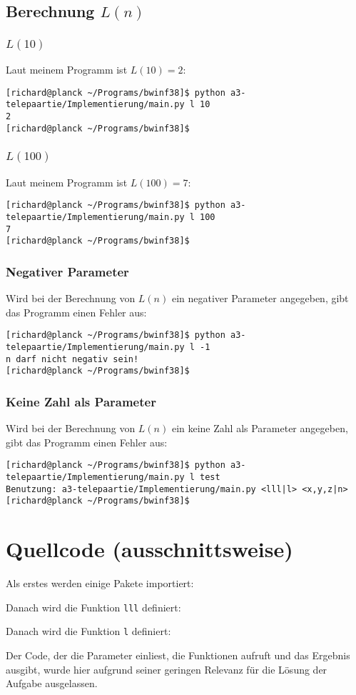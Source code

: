 \documentclass[a4paper,10pt,ngerman]{scrartcl}
\begin{document}
\subsection{Berechnung $L(n)$}
\subsubsection{$L(10)$}
Laut meinem Programm ist $L(10) = 2$:
\begin{lstlisting}
[richard@planck ~/Programs/bwinf38]$ python a3-telepaartie/Implementierung/main.py l 10
2
[richard@planck ~/Programs/bwinf38]$ 
\end{lstlisting}

\subsubsection{$L(100)$}
Laut meinem Programm ist $L(100) = 7$:
\begin{lstlisting}
[richard@planck ~/Programs/bwinf38]$ python a3-telepaartie/Implementierung/main.py l 100
7
[richard@planck ~/Programs/bwinf38]$ 
\end{lstlisting}
  
\subsubsection{Negativer Parameter}
Wird bei der Berechnung von $L(n)$ ein negativer Parameter angegeben, gibt das Programm einen Fehler aus:
\begin{lstlisting}
[richard@planck ~/Programs/bwinf38]$ python a3-telepaartie/Implementierung/main.py l -1
n darf nicht negativ sein!
[richard@planck ~/Programs/bwinf38]$ 
\end{lstlisting}

\subsubsection{Keine Zahl als Parameter}
Wird bei der Berechnung von $L(n)$ ein keine Zahl als Parameter angegeben, gibt das Programm einen Fehler aus:
\begin{lstlisting}
[richard@planck ~/Programs/bwinf38]$ python a3-telepaartie/Implementierung/main.py l test
Benutzung: a3-telepaartie/Implementierung/main.py <lll|l> <x,y,z|n>
[richard@planck ~/Programs/bwinf38]$ 
\end{lstlisting}


\section{Quellcode (ausschnittsweise)}
Als erstes werden einige Pakete importiert:


Danach wird die Funktion \texttt{lll} definiert:


Danach wird die Funktion \texttt{l} definiert:


Der Code, der die Parameter einliest, die Funktionen aufruft und das Ergebnis ausgibt, wurde hier aufgrund seiner geringen Relevanz für die Lösung der Aufgabe ausgelassen.
\end{document}
